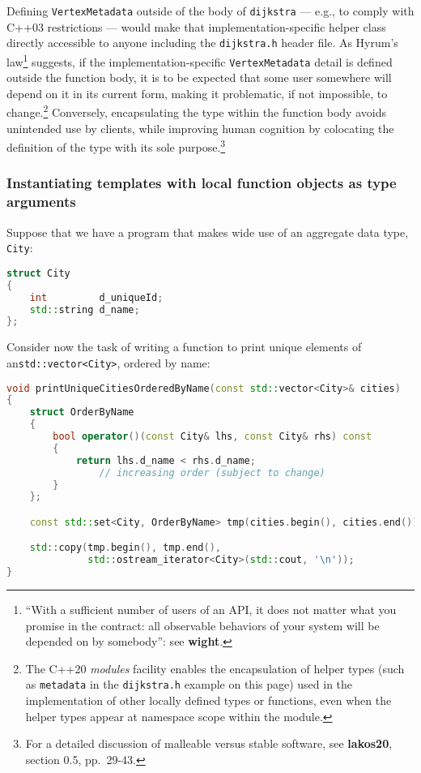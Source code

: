 \noindent Defining \texttt{VertexMetadata} outside of the body of
\texttt{dijkstra} --- e.g., to comply with C++03 restrictions --- would
make that implementation-specific helper class directly accessible to
anyone including the \texttt{dijkstra.h} header file. As Hyrum's
law{\cprotect\footnote{``With a sufficient number
of users of an API, it does not matter what you promise in the
contract: all observable behaviors of your system will be depended on
  by somebody'': see \textbf{wight}.}} suggests, if the 
imple\-men\-tation-specific \texttt{VertexMetadata} detail is defined
outside the function body, it is to be expected that some user somewhere
will depend on it in its current form, making it problematic, if not
impossible, to change.\footnote{The C++20 \emph{modules} facility enables the
encapsulation of helper types (such as \texttt{metadata} in the \mbox{\texttt{dijkstra.h}} example on this page) used in
the implementation of other locally defined types or functions, even
when the helper types appear at namespace scope within the module.} Conversely, encapsulating
the type within the function body avoids unintended use by clients,
while improving human cognition by colocating the definition of the
type with its sole purpose.{\cprotect\footnote{For a detailed
  discussion of malleable  versus stable software, see \textbf{{lakos20}},
  section 0.5, pp.~29-43.}}

\subsubsection[Instantiating templates with local function objects as type arguments]{Instantiating templates with local function objects as type arguments}\label{instantiating-templates-with-local-function-objects-as-type-arguments}

Suppose that we have a program that makes wide use of an aggregate data
type, \texttt{City}:

\begin{lstlisting}[language=C++]
struct City
{
    int         d_uniqueId;
    std::string d_name;
};
\end{lstlisting}
    
\noindent Consider now the task of writing a function to print unique elements of
an\linebreak[4] \texttt{std::vector<City>}, ordered by name:

\begin{lstlisting}[language=C++]
void printUniqueCitiesOrderedByName(const std::vector<City>& cities)
{
    struct OrderByName
    {
        bool operator()(const City& lhs, const City& rhs) const
        {
            return lhs.d_name < rhs.d_name;
                // increasing order (subject to change)
        }
    };

    const std::set<City, OrderByName> tmp(cities.begin(), cities.end());

    std::copy(tmp.begin(), tmp.end(),
              std::ostream_iterator<City>(std::cout, '\n'));
}
\end{lstlisting}
    
